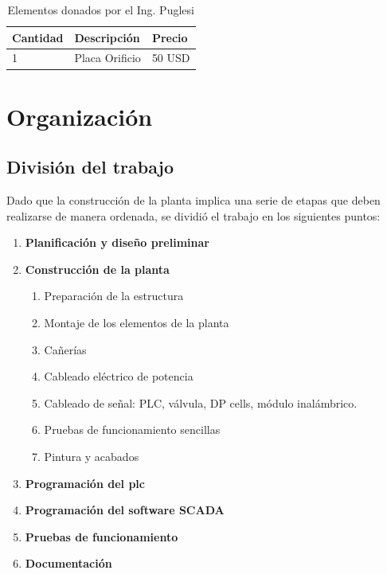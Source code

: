 \begin{table}[!t]
\renewcommand{\arraystretch}{1.3}
\centering
\begin{tabularx}{\textwidth}{l||X||l}
\hline
\bfseries Cantidad & \bfseries Descripción & \bfseries Precio\\
\hline \hline
1& Placa Orificio& 50 USD\\
\hline
\end{tabularx}
\caption{Elementos donados por el Ing. Puglesi}
\label{tab:donacionPuglesi}
\end{table}

\section{Organización}
\label{sec:Organizacion}
\subsection{División del trabajo}
Dado que la construcción de la planta implica una serie de etapas que
deben realizarse de manera ordenada, se dividió el trabajo en los siguientes
puntos:
\begin{enumerate}
 \item \textbf{Planificación y diseño preliminar}
  \item \textbf{Construcción de la planta}
  \begin{enumerate}
   \item Preparación de la estructura
   \item Montaje de los elementos de la planta
   \item Cañerías
   \item Cableado eléctrico de potencia
   \item Cableado de señal: PLC, válvula, DP cells, módulo inalámbrico.
   \item Pruebas de funcionamiento sencillas
   \item Pintura y acabados
  \end{enumerate}
  \item \textbf{Programación del \gls{plc}}
  \item \textbf{Programación del software SCADA}
  \item \textbf{Pruebas de funcionamiento}
  \item \textbf{Documentación}
\end{enumerate}

